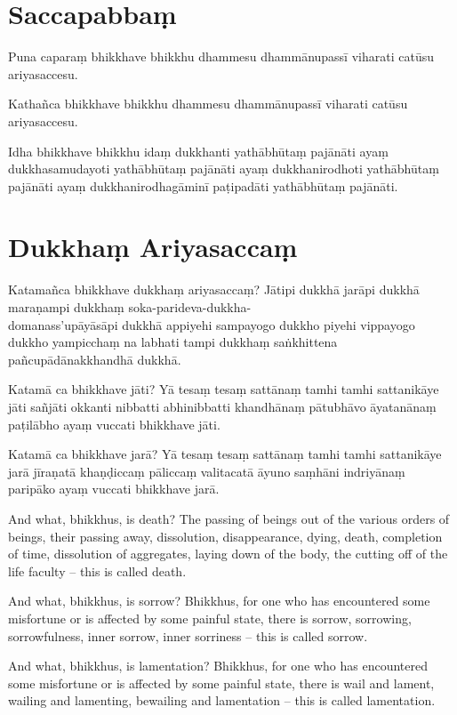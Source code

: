 \section*{Saccapabbaṃ}

Puna caparaṃ bhikkhave bhikkhu dhammesu dhammānupassī viharati catūsu
ariyasaccesu.

Kathañca bhikkhave bhikkhu dhammesu dhammānupassī viharati catūsu ariyasaccesu.

Idha bhikkhave bhikkhu idaṃ dukkhanti yathābhūtaṃ pajānāti ayaṃ dukkhasamudayoti
yathābhūtaṃ pajānāti ayaṃ dukkhanirodhoti yathābhūtaṃ pajānāti ayaṃ
dukkhanirodhagāminī paṭipadāti yathābhūtaṃ pajānāti.

\section*{Dukkhaṃ Ariyasaccaṃ}

Katamañca bhikkhave dukkhaṃ ariyasaccaṃ? Jātipi dukkhā jarāpi dukkhā maraṇampi
dukkhaṃ soka-parideva-dukkha-\\
domanass'upāyāsāpi dukkhā appiyehi sampayogo dukkho
piyehi vippayogo dukkho yampicchaṃ na labhati tampi dukkhaṃ saṅkhittena
pañcupādānakkhandhā dukkhā.

Katamā ca bhikkhave jāti? Yā tesaṃ tesaṃ sattānaṃ tamhi tamhi sattanikāye jāti
sañjāti okkanti nibbatti abhinibbatti khandhānaṃ pātubhāvo āyatanānaṃ paṭilābho
ayaṃ vuccati bhikkhave jāti.

Katamā ca bhikkhave jarā? Yā tesaṃ tesaṃ sattānaṃ tamhi tamhi sattanikāye jarā
jīraṇatā khaṇḍiccaṃ pāliccaṃ valitacatā āyuno saṃhāni indriyānaṃ paripāko ayaṃ
vuccati bhikkhave jarā.

\englishPage

And what, bhikkhus, is death? The passing of beings out of the various orders of
beings, their passing away, dissolution, disappearance, dying, death, completion
of time, dissolution of aggregates, laying down of the body, the cutting off of
the life faculty -- this is called death.

And what, bhikkhus, is sorrow? Bhikkhus, for one who has encountered some
misfortune or is affected by some painful state, there is sorrow, sorrowing,
sorrowfulness, inner sorrow, inner sorriness -- this is called sorrow.

And what, bhikkhus, is lamentation? Bhikkhus, for one who has encountered some
misfortune or is affected by some painful state, there is wail and lament,
wailing and lamenting, bewailing and lamentation -- this is called lamentation.

